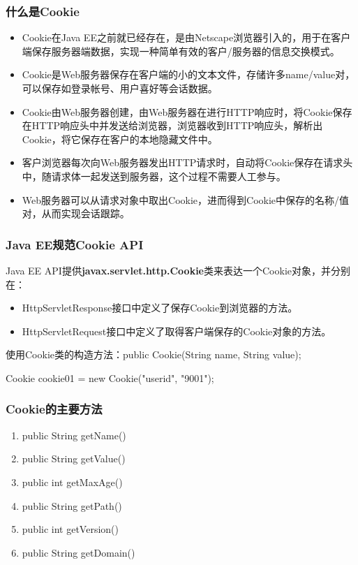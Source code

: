 \begin{frame}[fragile] %
\frametitle{什么是Cookie} 

\begin{itemize}\kai\small
\item Cookie在Java EE之前就已经存在，是由Netscape浏览器引入的，用于在客户端保存服务器端数据，实现一种简单有效的客户/服务器的信息交换模式。
\item Cookie是Web服务器保存在客户端的小的文本文件，存储许多name/value对，可以保存如登录帐号、用户喜好等会话数据。
\item Cookie由Web服务器创建，由Web服务器在进行HTTP响应时，将Cookie保存在HTTP响应头中并发送给浏览器，浏览器收到HTTP响应头，解析出Cookie，将它保存在客户的本地隐藏文件中。
\item 客户浏览器每次向Web服务器发出HTTP请求时，自动将Cookie保存在请求头中，随请求体一起发送到服务器，这个过程不需要人工参与。
\item Web服务器可以从请求对象中取出Cookie，进而得到Cookie中保存的名称/值对，从而实现会话跟踪。
\end{itemize}
\end{frame}

\begin{frame}[fragile] %
\frametitle{Java EE规范Cookie API} 

Java EE API提供{\bf javax.servlet.http.Cookie}类来表达一个Cookie对象，并分别在：

\begin{itemize}
\item HttpServletResponse接口中定义了保存Cookie到浏览器的方法。
\item HttpServletRequest接口中定义了取得客户端保存的Cookie对象的方法。
\end{itemize}


使用Cookie类的构造方法：public Cookie(String name, String value);
\begin{javaCode}
Cookie cookie01 = new Cookie("userid", "9001");
\end{javaCode}
\end{frame}

\begin{frame}[fragile] %
\frametitle{Cookie的主要方法} 
\begin{enumerate}
\item public String getName()
\item public String getValue()
\item public int getMaxAge()
\item public String getPath()
\item public int getVersion()
\item public String getDomain()
\end{enumerate}
\end{frame}

